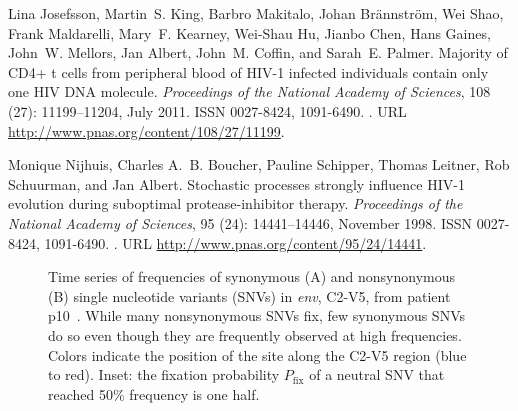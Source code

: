 \documentclass[11pt]{article}
\newcommand{\pfix}{P_{\mathrm{fix}}}
\newcommand{\env}{\textit{env}}
\newcommand{\shankaregion}{C2-V5}
\begin{document}
\begin{thebibliography}{48}
Lina Josefsson, Martin~S. King, Barbro Makitalo, Johan Br\"annstr\"om, Wei
  Shao, Frank Maldarelli, Mary~F. Kearney, Wei-Shau Hu, Jianbo Chen, Hans
  Gaines, John~W. Mellors, Jan Albert, John~M. Coffin, and Sarah~E. Palmer.
\newblock Majority of {CD4+} t cells from peripheral blood of {HIV-1} infected
  individuals contain only one {HIV} {DNA} molecule.
\newblock \emph{Proceedings of the National Academy of Sciences}, 108
  (27): 11199--11204, July 2011.
\newblock ISSN 0027-8424, 1091-6490.
\newblock {}.
\newblock URL \url{http://www.pnas.org/content/108/27/11199}.

Monique Nijhuis, Charles A.~B. Boucher, Pauline Schipper, Thomas Leitner, Rob
  Schuurman, and Jan Albert.
\newblock Stochastic processes strongly influence {HIV-1} evolution during
  suboptimal protease-inhibitor therapy.
\newblock \emph{Proceedings of the National Academy of Sciences}, 95
  (24): 14441--14446, November 1998.
\newblock ISSN 0027-8424, 1091-6490.
\newblock {}.
\newblock URL \url{http://www.pnas.org/content/95/24/14441}.

\end{thebibliography}



\begin{figure}
\begin{center}
\caption{Time series of frequencies
of synonymous (A) and nonsynonymous (B) single nucleotide variants (SNVs) in \env, 
\shankaregion, from patient p10~\cite{shankarappa_consistent_1999}.
While many nonsynonymous SNVs fix, few synonymous
SNVs do so even though they are frequently observed at high
frequencies. Colors indicate the position of the site along the \shankaregion{} region
(blue to red). Inset: the fixation probability $\pfix$ of a neutral
SNV that reached 50\% frequency is one half.}
\label{fig:aft}
\end{center}
\end{figure}
\end{document}
